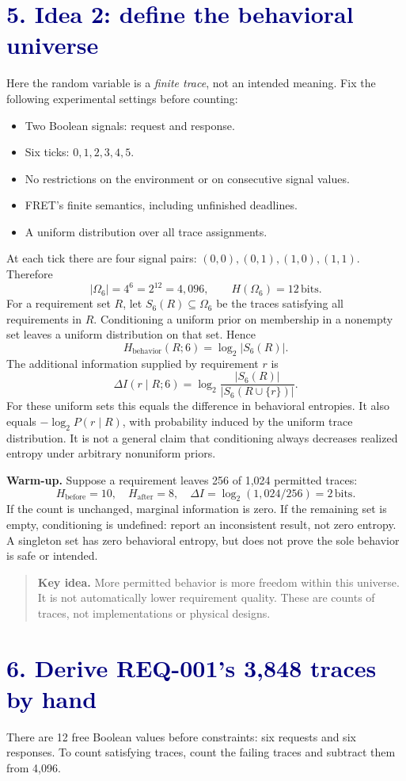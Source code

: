 \documentclass[11pt,a4paper]{article}
\newcommand{\lesson}[2]{\section*{\textcolor{navy}{#1. #2}}}
\newcommand{\key}[1]{\begin{quote}\color{teal}\textbf{Key idea.} #1\end{quote}}
\newcommand{\bits}{\,\mathrm{bits}}
\begin{document}
\lesson{5}{Idea 2: define the behavioral universe}
Here the random variable is a \emph{finite trace}, not an intended meaning. Fix the following experimental settings before counting:
\begin{itemize}
\item Two Boolean signals: request and response.
\item Six ticks: \(0,1,2,3,4,5\).
\item No restrictions on the environment or on consecutive signal values.
\item FRET's finite semantics, including unfinished deadlines.
\item A uniform distribution over all trace assignments.
\end{itemize}
At each tick there are four signal pairs: \((0,0),(0,1),(1,0),(1,1)\). Therefore
\[
|\Omega_6|=4^6=2^{12}=4,096,\qquad H(\Omega_6)=12\bits.
\]
For a requirement set \(R\), let \(S_6(R)\subseteq\Omega_6\) be the traces satisfying all requirements in \(R\). Conditioning a uniform prior on membership in a nonempty set leaves a uniform distribution on that set. Hence
\[
\boxed{H_{\mathrm{behavior}}(R;6)=\log_2|S_6(R)|.}
\]
The additional information supplied by requirement \(r\) is
\[
\boxed{\Delta I(r\mid R;6)=\log_2\frac{|S_6(R)|}{|S_6(R\cup\{r\})|}.}
\]
For these uniform sets this equals the difference in behavioral entropies. It also equals \(-\log_2 P(r\mid R)\), with probability induced by the uniform trace distribution. It is not a general claim that conditioning always decreases realized entropy under arbitrary nonuniform priors.

\textbf{Warm-up.} Suppose a requirement leaves 256 of 1,024 permitted traces:
\[
H_{\mathrm{before}}=10,\quad H_{\mathrm{after}}=8,\quad
\Delta I=\log_2(1,024/256)=2\bits.
\]
If the count is unchanged, marginal information is zero. If the remaining set is empty, conditioning is undefined: report an inconsistent result, not zero entropy. A singleton set has zero behavioral entropy, but does not prove the sole behavior is safe or intended.

\key{More permitted behavior is more freedom within this universe. It is not automatically lower requirement quality. These are counts of traces, not implementations or physical designs.}
\newpage

\lesson{6}{Derive REQ-001's 3,848 traces by hand}
There are 12 free Boolean values before constraints: six requests and six responses. To count satisfying traces, count the failing traces and subtract them from 4,096.
\end{document}
